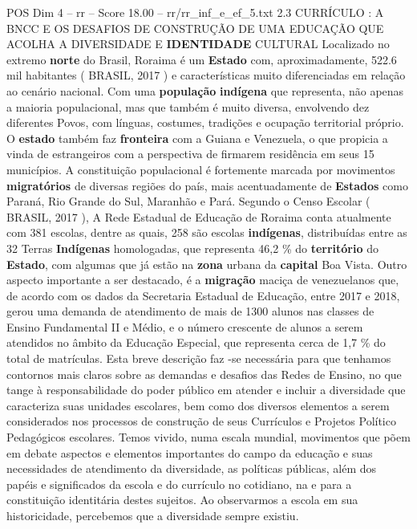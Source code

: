 \begin{textsample}{POS Dim 4 – rr – Score 18.00 – rr/rr\_inf\_e\_ef\_5.txt}  \label{ex:f4_pos_111}
2.3 CURRÍCULO : A BNCC E OS DESAFIOS DE CONSTRUÇÃO DE UMA EDUCAÇÃO QUE ACOLHA A DIVERSIDADE E \textbf{IDENTIDADE} CULTURAL Localizado no extremo \textbf{norte} do Brasil, Roraima é um \textbf{Estado} com, aproximadamente, 522.6 mil habitantes ( BRASIL, 2017 ) e características muito diferenciadas em relação ao cenário nacional.
Com uma \textbf{população} \textbf{indígena} que representa, não apenas a maioria populacional, mas que também é muito diversa, envolvendo dez diferentes Povos, com línguas, costumes, tradições e ocupação territorial próprio.
O \textbf{estado} também faz \textbf{fronteira} com a Guiana e Venezuela, o que propicia a vinda de estrangeiros com a perspectiva de firmarem residência em seus 15 municípios.
A constituição populacional é fortemente marcada por movimentos \textbf{migratórios} de diversas regiões do país, mais acentuadamente de \textbf{Estados} como Paraná, Rio Grande do Sul, Maranhão e Pará.
Segundo o Censo Escolar ( BRASIL, 2017 ), A Rede Estadual de Educação de Roraima conta atualmente com 381 escolas, dentre as quais, 258 são escolas \textbf{indígenas}, distribuídas entre as 32 Terras \textbf{Indígenas} homologadas, que representa 46,2 \% do \textbf{território} do \textbf{Estado}, com algumas que já estão na \textbf{zona} urbana da \textbf{capital} Boa Vista.
Outro aspecto importante a ser destacado, é a \textbf{migração} maciça de venezuelanos que, de acordo com os dados da Secretaria Estadual de Educação, entre 2017 e 2018, gerou uma demanda de atendimento de mais de 1300 alunos nas classes de Ensino Fundamental II e Médio, e o número crescente de alunos a serem atendidos no âmbito da Educação Especial, que representa cerca de 1,7 \% do total de matrículas.
Esta breve descrição faz -se necessária para que tenhamos contornos mais claros sobre as demandas e desafios das Redes de Ensino, no que tange à responsabilidade do poder público em atender e incluir a diversidade que caracteriza suas unidades escolares, bem como dos diversos elementos a serem considerados nos processos de construção de seus Currículos e Projetos Político Pedagógicos escolares.
Temos vivido, numa escala mundial, movimentos que põem em debate aspectos e elementos importantes do campo da educação e suas necessidades de atendimento da diversidade, as políticas públicas, além dos papéis e significados da escola e do currículo no cotidiano, na e para a constituição identitária destes sujeitos.
Ao observarmos a escola em sua historicidade, percebemos que a diversidade sempre existiu.

\end{textsample}
